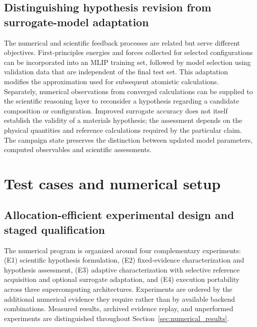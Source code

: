 \documentclass[11pt,a4paper]{article}
\begin{document}
\subsection{Distinguishing hypothesis revision from surrogate-model adaptation}
The numerical and scientific feedback processes are related but serve different objectives. First-principles energies and forces collected for selected configurations can be incorporated into an MLIP training set, followed by model selection using validation data that are independent of the final test set. This adaptation modifies the approximation used for subsequent atomistic calculations. Separately, numerical observations from converged calculations can be supplied to the scientific reasoning layer to reconsider a hypothesis regarding a candidate composition or configuration. Improved surrogate accuracy does not itself establish the validity of a materials hypothesis; the assessment depends on the physical quantities and reference calculations required by the particular claim. The campaign state preserves the distinction between updated model parameters, computed observables and scientific assessments.
\section{Test cases and numerical setup}
\label{sec:methodology}

\subsection{Allocation-efficient experimental design and staged qualification}
\label{sec:setup:cost_staging}
The numerical program is organized around four complementary experiments: (E1) scientific hypothesis formulation, (E2) fixed-evidence characterization and hypothesis assessment, (E3) adaptive characterization with selective reference acquisition and optional surrogate adaptation, and (E4) execution portability across three supercomputing architectures. Experiments are ordered by the additional numerical evidence they require rather than by available backend combinations. Measured results, archived evidence replay, and unperformed experiments are distinguished throughout Section~\ref{sec:numerical_results}.
\end{document}

